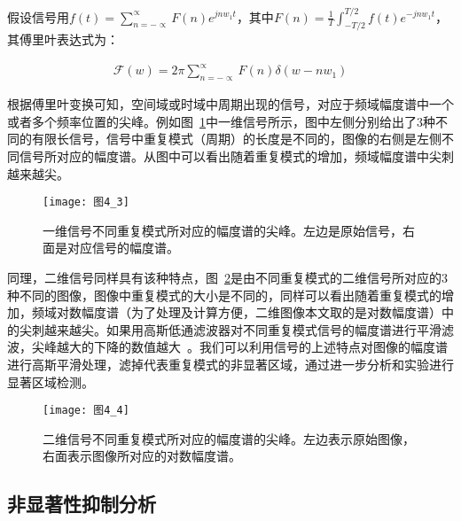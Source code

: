 假设信号用$f(t)=\sum_{n=-\propto}^{\propto}F(n)e^{jnw_{1}t}$，其中$F(n)=\frac{1}{T}\int_{-T/2}^{T/2}f(t)e^{-jnw_{1}t}$，其傅里叶表达式为：
\begin{linenomath}
\begin{align}
\mathcal{F}(w)=2\pi\sum_{n=-\propto}^{\propto}F(n)\delta(w-nw_{1})
\label{式4_1}
\end{align}
\end{linenomath}
根据傅里叶变换可知，空间域或时域中周期出现的信号，对应于频域幅度谱中一个或者多个频率位置的尖峰。例如图~\ref{图4_3}中一维信号所示，图中左侧分别给出了$3$种不同的有限长信号，信号中重复模式（周期）的长度是不同的，图像的右侧是左侧不同信号所对应的幅度谱。从图中可以看出随着重复模式的增加，频域幅度谱中尖刺越来越尖。
\begin{figure}[h]
  \centering
  \texttt{[image: 图4\_3]}
  \caption{一维信号不同重复模式所对应的幅度谱的尖峰。左边是原始信号，右面是对应信号的幅度谱。}   
  \label{图4_3} 
\end{figure}
同理，二维信号同样具有该种特点，图~\ref{图4_4}是由不同重复模式的二维信号所对应的3种不同的图像，图像中重复模式的大小是不同的，同样可以看出随着重复模式的增加，频域对数幅度谱（为了处理及计算方便，二维图像本文取的是对数幅度谱）中的尖刺越来越尖。如果用高斯低通滤波器对不同重复模式信号的幅度谱进行平滑滤波，尖峰越大的下降的数值越大~\cite{LiJianTPAMI2013Scale}。我们可以利用信号的上述特点对图像的幅度谱进行高斯平滑处理，滤掉代表重复模式的非显著区域，通过进一步分析和实验进行显著区域检测。
\begin{figure}[h]
  \centering
  \texttt{[image: 图4\_4]}
  \caption{二维信号不同重复模式所对应的幅度谱的尖峰。左边表示原始图像，右面表示图像所对应的对数幅度谱。}   
  \label{图4_4} 
\end{figure}

\subsection{非显著性抑制分析}
\label{4_1_2}

